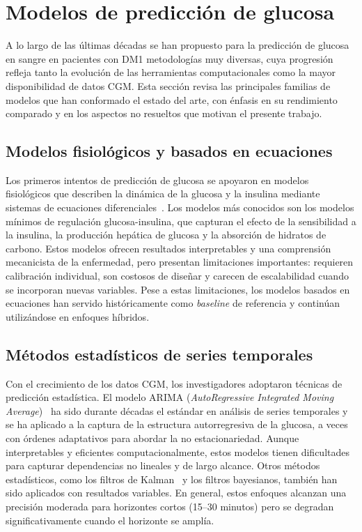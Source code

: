 \section{Modelos de predicción de glucosa}
\label{sec:prediccion_glucosa_literatura}

A lo largo de las últimas décadas se han propuesto para la predicción de glucosa en sangre en pacientes con DM1 metodologías muy diversas, cuya progresión refleja tanto la evolución de las herramientas computacionales como la mayor disponibilidad de datos CGM. Esta sección revisa las principales familias de modelos que han conformado el estado del arte, con énfasis en su rendimiento comparado y en los aspectos no resueltos que motivan el presente trabajo.

\subsection{Modelos fisiológicos y basados en ecuaciones}
\label{subsec:modelos_fisiologicos}

Los primeros intentos de predicción de glucosa se apoyaron en modelos fisiológicos que describen la dinámica de la glucosa y la insulina mediante sistemas de ecuaciones diferenciales~\cite{bergman1979minimal}. Los modelos más conocidos son los modelos mínimos de regulación glucosa-insulina, que capturan el efecto de la sensibilidad a la insulina, la producción hepática de glucosa y la absorción de hidratos de carbono. Estos modelos ofrecen resultados interpretables y una comprensión mecanicista de la enfermedad, pero presentan limitaciones importantes: requieren calibración individual, son costosos de diseñar y carecen de escalabilidad cuando se incorporan nuevas variables. Pese a estas limitaciones, los modelos basados en ecuaciones han servido históricamente como \emph{baseline} de referencia y continúan utilizándose en enfoques híbridos.

\subsection{Métodos estadísticos de series temporales}
\label{subsec:modelos_estadisticos}

Con el crecimiento de los datos CGM, los investigadores adoptaron técnicas de predicción estadística. El modelo ARIMA (\emph{AutoRegressive Integrated Moving Average})~\cite{contreras2003arima} ha sido durante décadas el estándar en análisis de series temporales y se ha aplicado a la captura de la estructura autorregresiva de la glucosa, a veces con órdenes adaptativos para abordar la no estacionariedad. Aunque interpretables y eficientes computacionalmente, estos modelos tienen dificultades para capturar dependencias no lineales y de largo alcance. Otros métodos estadísticos, como los filtros de Kalman~\cite{reifman2007predictive} y los filtros bayesianos, también han sido aplicados con resultados variables. En general, estos enfoques alcanzan una precisión moderada para horizontes cortos (15--30 minutos) pero se degradan significativamente cuando el horizonte se amplía.

